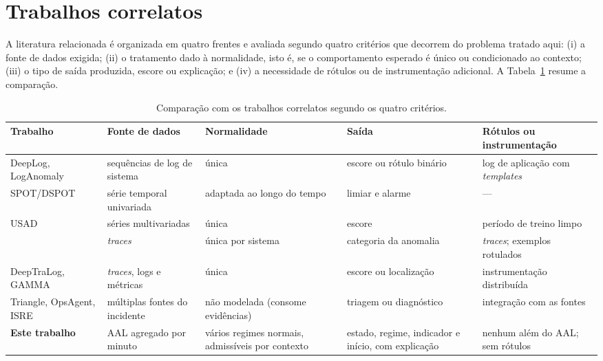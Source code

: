 \documentclass[sigconf,nonacm]{acmart}
\begin{document}
\section{Trabalhos correlatos}\label{sec:correlatos}

A literatura relacionada é organizada em quatro frentes e avaliada segundo quatro critérios que decorrem do problema tratado aqui: (i) a fonte de dados exigida; (ii) o tratamento dado à normalidade, isto é, se o comportamento esperado é único ou condicionado ao contexto; (iii) o tipo de saída produzida, escore ou explicação; e (iv) a necessidade de rótulos ou de instrumentação adicional. A Tabela~\ref{tab:correlatos} resume a comparação.

\begin{table}[t]
  \caption{Comparação com os trabalhos correlatos segundo os quatro critérios.}
  \label{tab:correlatos}
  \small
  \begin{tabular}{p{}p{}p{}p{}p{}}
    \toprule
    Trabalho & Fonte de dados & Normalidade & Saída & Rótulos ou instrumentação \\
    \midrule
    DeepLog, LogAnomaly & sequências de log de sistema & única & escore ou rótulo binário & log de aplicação com \emph{templates} \\
    SPOT/DSPOT & série temporal univariada & adaptada ao longo do tempo & limiar e alarme & --- \\
    USAD & séries multivariadas & única & escore & período de treino limpo \\
    \citet{wang2025crosssystem} & \emph{traces} & única por sistema & categoria da anomalia & \emph{traces}; exemplos rotulados \\
    DeepTraLog, GAMMA & \emph{traces}, logs e métricas & única & escore ou localização & instrumentação distribuída \\
    Triangle, OpsAgent, ISRE & múltiplas fontes do incidente & não modelada (consome evidências) & triagem ou diagnóstico & integração com as fontes \\
    \midrule
    \textbf{Este trabalho} & AAL agregado por minuto & vários regimes normais, admissíveis por contexto & estado, regime, indicador e início, com explicação & nenhum além do AAL; sem rótulos \\
    \bottomrule
  \end{tabular}
\end{table}
\end{document}

